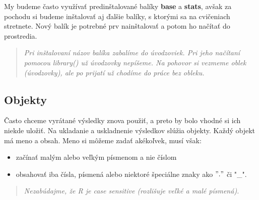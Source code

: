 My budeme často využívať predinštalované balíky \textbf{base} a
\textbf{stats}, avšak za pochodu si budeme inštalovať aj ďalšie balíky,
s ktorými sa na cvičeniach stretnete. Nový balík je potrebné prv
nainštalovať a potom ho načítať do prostredia.

\begin{Shaded}
\begin{Highlighting}[]

\NormalTok{(}\NormalTok{)}



\end{Highlighting}
\end{Shaded}

\begin{quote}
\emph{Pri inštalovaní názov balíka zabalíme do úvodzoviek. Pri jeho
načítaní pomocou library() už úvodzovky nepíšeme. Na pohovor si vezmeme
oblek (úvodzovky), ale po prijatí už chodíme do práce bez obleku.}
\end{quote}

\hypertarget{objekty}{%
\subsection{Objekty}\label{objekty}}

Často chceme vyrátané výsledky znova použiť, a preto by bolo vhodné si
ich niekde uložiť. Na ukladanie a uskladnenie výsledkov slúžia objekty.
Každý objekt má meno a obsah. Meno si môžeme zadať akékoľvek, musí však:

\begin{itemize}
\tightlist
\item
  začínať malým alebo veľkým písmenom a nie číslom
\item
  obsahovať iba čísla, písmená alebo niektoré špeciálne znaky ako
  \("."\) či "\_".
\end{itemize}

\begin{quote}
\emph{Nezabúdajme, že R je case sensitive (rozlišuje veľké a malé
písmená).}
\end{quote}

